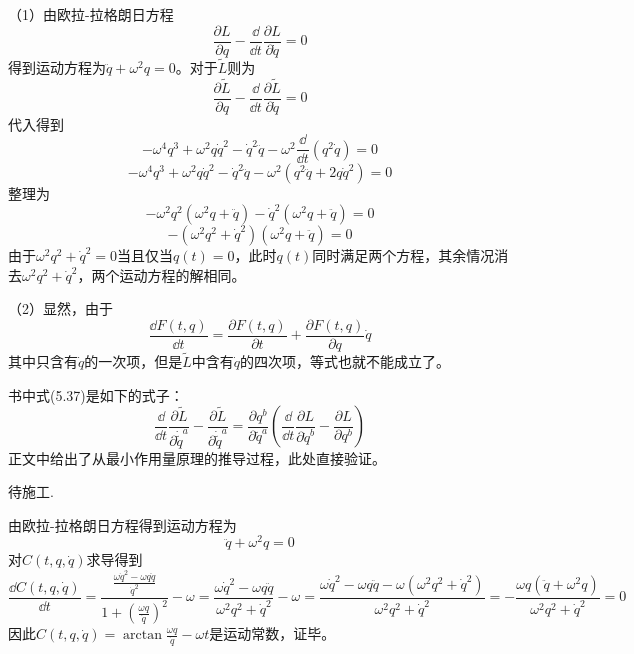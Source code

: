 \begin{solution}
	（1）由欧拉-拉格朗日方程
	\[\frac{\partial L}{\partial q}-\frac{\dd}{\dd t}\frac{\partial L}{\partial \dot{q}}=0\]
	得到运动方程为\(\ddot{q}+\omega^2 q=0\)。对于\(\tilde{L}\)则为
	\[\frac{\partial \tilde{L}}{\partial q}-\frac{\dd}{\dd t}\frac{\partial \tilde{L}}{\partial \dot{q}}=0\]
	代入得到
	\[-\omega^4 q^3+\omega^2 q\dot{q}^2-\dot{q}^2\ddot{q}-\omega^2\frac{\dd }{\dd t}(q^2\dot{q})=0\]
	\[-\omega^4 q^3+\omega^2 q\dot{q}^2-\dot{q}^2\ddot{q}-\omega^2(q^2\ddot{q}+2q\dot{q}^2)=0\]
	整理为
	\[-\omega^2 q^2(\omega^2 q+\ddot{q})-\dot{q}^2(\omega^2 q+\ddot{q})=0\]
	\[-(\omega^2 q^2+\dot{q}^2)(\omega^2 q+\ddot{q})=0\]
	由于\(\omega^2 q^2+\dot{q}^2=0\)当且仅当\(q(t)=0\)，此时\(q(t)\)同时满足两个方程，其余情况消去\(\omega^2 q^2+\dot{q}^2\)，两个运动方程的解相同。
	
	（2）显然，由于
	\[\frac{\dd F(t,q)}{\dd t}=\frac{\partial F(t,q)}{\partial t}+\frac{\partial F(t,q)}{\partial q}\dot{q}\]
	其中只含有\(\dot{q}\)的一次项，但是\(\tilde{L}\)中含有\(\dot{q}\)的四次项，等式也就不能成立了。
\end{solution}




\begin{solution}
	书中式(5.37)是如下的式子：
	\[\frac{\dd }{\dd t}\frac{\partial\tilde{L}}{\partial\dot{\tilde{q}}^a}-\frac{\partial\tilde{L}}{\partial \dot{\tilde{q}}^a}=\frac{\partial q^b}{\partial \tilde{q}^a}\left(\frac{\dd}{\dd t}\frac{\partial L}{\partial\dot{q}^b}-\frac{\partial L}{\partial q^b}\right)\]
	正文中给出了从最小作用量原理的推导过程，此处直接验证。
	
	待施工.
\end{solution}




\begin{solution}
	由欧拉-拉格朗日方程得到运动方程为
	\[\ddot{q}+\omega^2 q=0\]
	对\(C(t,q,\dot{q})\)求导得到
	\[\frac{\dd C(t,q,\dot{q})}{\dd t}=\frac{\frac{\omega\dot{q}^2-\omega q \ddot{q}}{\dot{q}^2}}{1+\left(\frac{\omega q}{\dot{q}}\right)^2}-\omega=\frac{\omega\dot{q}^2-\omega q \ddot{q}}{\omega^2 q^2+\dot{q}^2}-\omega=\frac{\omega\dot{q}^2-\omega q \ddot{q}-\omega(\omega^2 q^2+\dot{q}^2)}{\omega^2 q^2+\dot{q}^2}=-\frac{\omega q(\ddot{q}+\omega^2 q)}{\omega^2 q^2+\dot{q}^2}=0\]
	因此\(C(t,q,\dot{q})=\arctan{\frac{\omega q}{\dot{q}}}-\omega t\)是运动常数，证毕。
\end{solution}



